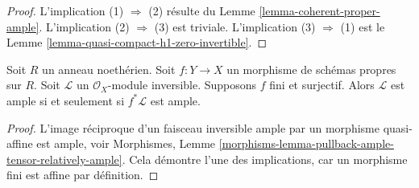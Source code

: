 \begin{proof}
L'implication (1) $\Rightarrow$ (2) résulte du
Lemme \ref{lemma-coherent-proper-ample}.
L'implication (2) $\Rightarrow$ (3) est triviale.
L'implication (3) $\Rightarrow$ (1) est le
Lemme \ref{lemma-quasi-compact-h1-zero-invertible}.
\end{proof}

\begin{lemma}
\label{lemma-surjective-finite-morphism-ample}
Soit $R$ un anneau noethérien. Soit $f : Y \to X$ un morphisme de
schémas propres sur $R$. Soit $\mathcal{L}$ un
$\mathcal{O}_X$-module inversible. Supposons $f$ fini et surjectif.
Alors $\mathcal{L}$ est ample si et seulement si $f^*\mathcal{L}$ est ample.
\end{lemma}

\begin{proof}
L'image réciproque d'un faisceau inversible ample par un morphisme quasi-affine
est ample, voir Morphismes, Lemme
\ref{morphisms-lemma-pullback-ample-tensor-relatively-ample}.
Cela démontre l'une des implications, car un morphisme fini est affine
par définition.


\end{proof}
